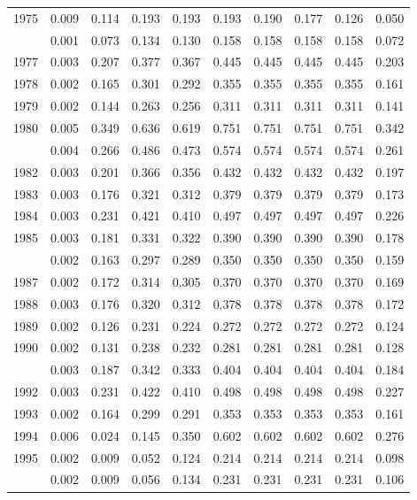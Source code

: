 \documentclass[
]{article}
\begin{document}
\begin{longtable}[t]{lrrrrrrrrr}
1975 & 0.009 & 0.114 & 0.193 & 0.193 & 0.193 & 0.190 & 0.177 & 0.126 & 0.050\\
\addlinespace
1976 & 0.001 & 0.073 & 0.134 & 0.130 & 0.158 & 0.158 & 0.158 & 0.158 & 0.072\\
1977 & 0.003 & 0.207 & 0.377 & 0.367 & 0.445 & 0.445 & 0.445 & 0.445 & 0.203\\
1978 & 0.002 & 0.165 & 0.301 & 0.292 & 0.355 & 0.355 & 0.355 & 0.355 & 0.161\\
1979 & 0.002 & 0.144 & 0.263 & 0.256 & 0.311 & 0.311 & 0.311 & 0.311 & 0.141\\
1980 & 0.005 & 0.349 & 0.636 & 0.619 & 0.751 & 0.751 & 0.751 & 0.751 & 0.342\\
\addlinespace
1981 & 0.004 & 0.266 & 0.486 & 0.473 & 0.574 & 0.574 & 0.574 & 0.574 & 0.261\\
1982 & 0.003 & 0.201 & 0.366 & 0.356 & 0.432 & 0.432 & 0.432 & 0.432 & 0.197\\
1983 & 0.003 & 0.176 & 0.321 & 0.312 & 0.379 & 0.379 & 0.379 & 0.379 & 0.173\\
1984 & 0.003 & 0.231 & 0.421 & 0.410 & 0.497 & 0.497 & 0.497 & 0.497 & 0.226\\
1985 & 0.003 & 0.181 & 0.331 & 0.322 & 0.390 & 0.390 & 0.390 & 0.390 & 0.178\\
\addlinespace
1986 & 0.002 & 0.163 & 0.297 & 0.289 & 0.350 & 0.350 & 0.350 & 0.350 & 0.159\\
1987 & 0.002 & 0.172 & 0.314 & 0.305 & 0.370 & 0.370 & 0.370 & 0.370 & 0.169\\
1988 & 0.003 & 0.176 & 0.320 & 0.312 & 0.378 & 0.378 & 0.378 & 0.378 & 0.172\\
1989 & 0.002 & 0.126 & 0.231 & 0.224 & 0.272 & 0.272 & 0.272 & 0.272 & 0.124\\
1990 & 0.002 & 0.131 & 0.238 & 0.232 & 0.281 & 0.281 & 0.281 & 0.281 & 0.128\\
\addlinespace
1991 & 0.003 & 0.187 & 0.342 & 0.333 & 0.404 & 0.404 & 0.404 & 0.404 & 0.184\\
1992 & 0.003 & 0.231 & 0.422 & 0.410 & 0.498 & 0.498 & 0.498 & 0.498 & 0.227\\
1993 & 0.002 & 0.164 & 0.299 & 0.291 & 0.353 & 0.353 & 0.353 & 0.353 & 0.161\\
1994 & 0.006 & 0.024 & 0.145 & 0.350 & 0.602 & 0.602 & 0.602 & 0.602 & 0.276\\
1995 & 0.002 & 0.009 & 0.052 & 0.124 & 0.214 & 0.214 & 0.214 & 0.214 & 0.098\\
\addlinespace
1996 & 0.002 & 0.009 & 0.056 & 0.134 & 0.231 & 0.231 & 0.231 & 0.231 & 0.106\\

\end{longtable}
\end{document}
